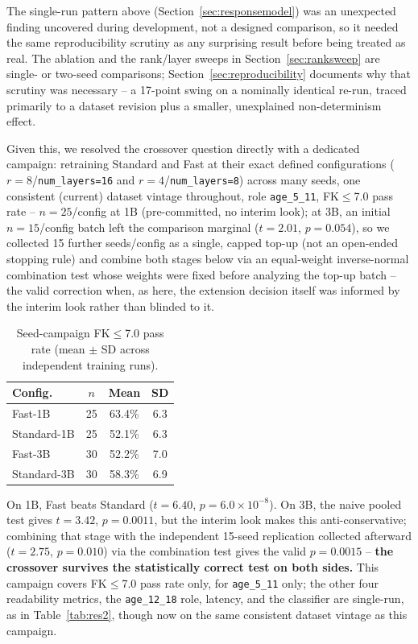 \documentclass[pdflatex,sn-mathphys-num]{sn-jnl-official}%
\begin{document}
The single-run pattern above (Section~\ref{sec:responsemodel}) was an unexpected finding uncovered during development, not a designed comparison, so it needed the same reproducibility scrutiny as any surprising result before being treated as real. The ablation and the rank/layer sweeps in Section~\ref{sec:ranksweep} are single- or two-seed comparisons; Section~\ref{sec:reproducibility} documents why that scrutiny was necessary -- a 17-point swing on a nominally identical re-run, traced primarily to a dataset revision plus a smaller, unexplained non-determinism effect.

Given this, we resolved the crossover question directly with a dedicated campaign: retraining Standard and Fast at their exact defined configurations ($r=8$/\texttt{num\_layers=16} and $r=4$/\texttt{num\_layers=8}) across many seeds, one consistent (current) dataset vintage throughout, role \texttt{age\_5\_11}, FK$\leq$7.0 pass rate -- $n=25$/config at 1B (pre-committed, no interim look); at 3B, an initial $n=15$/config batch left the comparison marginal ($t=2.01$, $p=0.054$), so we collected 15 further seeds/config as a single, capped top-up (not an open-ended stopping rule) and combine both stages below via an equal-weight inverse-normal combination test whose weights were fixed before analyzing the top-up batch -- the valid correction when, as here, the extension decision itself was informed by the interim look rather than blinded to it.

\begin{table}[!h]
  \centering
  \caption{Seed-campaign FK$\leq$7.0 pass rate (mean $\pm$ SD across independent training runs).}
  \label{tab:seedcampaign}
  \small
  \begin{tabular}{@{}lccc@{}}
    \toprule
    Config. & $n$ & Mean & SD \\
    \midrule
    Fast-1B     & 25 & 63.4\% & 6.3 \\
    Standard-1B & 25 & 52.1\% & 6.3 \\
    Fast-3B     & 30 & 52.2\% & 7.0 \\
    Standard-3B & 30 & 58.3\% & 6.9 \\
    \bottomrule
  \end{tabular}
\end{table}

On 1B, Fast beats Standard ($t=6.40$, $p=6.0\times10^{-8}$). On 3B, the naive pooled test gives $t=3.42$, $p=0.0011$, but the interim look makes this anti-conservative; combining that stage with the independent 15-seed replication collected afterward ($t=2.75$, $p=0.010$) via the combination test gives the valid $p=0.0015$ -- \textbf{the crossover survives the statistically correct test on both sides.} This campaign covers FK$\leq$7.0 pass rate only, for \texttt{age\_5\_11} only; the other four readability metrics, the \texttt{age\_12\_18} role, latency, and the classifier are single-run, as in Table~\ref{tab:res2}, though now on the same consistent dataset vintage as this campaign.
\end{document}
